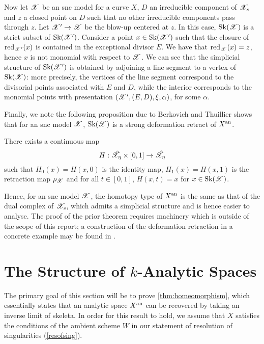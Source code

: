 Now let $\mathscr{X}$ be an snc model for a curve $X$, $D$ an irreducible component of $\mathscr{X}_s$ and $z$ a closed point on $D$ such that no other irreducible components pass through $z$.
Let $\mathscr{X}' \to \mathscr{X}$ be the blow-up centered at $z$.
In this case, $\operatorname{Sk}(\mathscr{X})$ is a strict subset of $\operatorname{Sk}(\mathscr{X}')$.
Consider a point $x \in \operatorname{Sk}(\mathscr{X}')$ such that the closure of $\operatorname{red}_{\mathscr{X}'}(x)$ is contained in the exceptional divisor $E$. 
We have that $\operatorname{red}_{\mathscr{X}}(x) = z$, hence $x$ is not monomial with respect to $\mathscr{X}$.
We can see that the simplicial structure of $\operatorname{Sk}(\mathscr{X}')$ is obtained by adjoining a line segment to a vertex of $\operatorname{Sk}(\mathscr{X})$: more precisely, the vertices of the line segment correspond to the divisorial points associated with $E$ and $D$, while the interior corresponds to the monomial points with presentation $(\mathscr{X}', (E, D), \xi, \alpha)$, for some $\alpha$.

Finally, we note the following proposition due to Berkovich and Thuillier shows that for an snc model $\mathscr{X}$, $\operatorname{Sk}(\mathscr{X})$ is a strong deformation retract of $X^{\text{an}}$.

\begin{prop} \parencite[Theorem 3.26]{thuillier}
    There exists a continuous map 
    \[
        H: \hat{\mathscr{X}}_\eta \times [0, 1] \to \hat{\mathscr{X}}_\eta
    \]
    such that $H_0(x) = H(x, 0)$ is the identity map, $H_1(x) = H(x, 1)$ is the retraction map $\rho_{\mathscr{X}}$ and for all $t \in [0, 1]$, $H(x, t) = x$ for $x \in \operatorname{Sk}(\mathscr{X})$.
\end{prop}

Hence, for an snc model $\mathscr{X}$, the homotopy type of $X^{\text{an}}$ is the same as that of the dual complex of $\mathscr{X}_s$, which admits a simplicial structure and is hence easier to analyse.
The proof of the prior theorem requires machinery which is outside of the scope of this report; a construction of the deformation retraction in a concrete example may be found in \parencite[\S 2.5]{birgeom}.

\section{The Structure of $k$-Analytic Spaces}

The primary goal of this section will be to prove \cref{thm:homeomorphism}, which essentially states that an analytic space $X^{\text{an}}$ can be recovered by taking an inverse limit of skeleta.
In order for this result to hold, we assume that $X$ satisfies the conditions of the ambient scheme $W$ in our statement of resolution of singularities (\cref{resofsing}).

